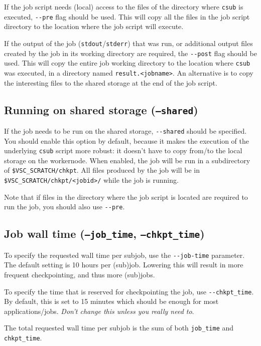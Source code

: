 If the job script needs (local) access to the files of the directory where \lstinline|csub|
is executed, \lstinline|--pre| flag should be used. This will copy all the files in the job
script directory to the location where the job script will execute.

If the output of the job (\lstinline|stdout|/\lstinline|stderr|) that was run,
or additional output files created by the job in its working directory are required,
the \lstinline|--post| flag should be used. This will copy the entire job working directory
to the location where \lstinline|csub| was executed, in a directory named \lstinline|result.<jobname>|.
An alternative is to copy the interesting files to the shared storage at the end of the job script.


\subsection{Running on shared storage (\texttt{--shared})}

If the job needs to be run on the shared storage, \lstinline|--shared| should be specified.
You should enable this option by default, because it makes the execution of the
underlying \lstinline|csub| script more robust: it doesn't have to copy from/to
the local storage on the workernode. When enabled, the job will be run in a
subdirectory of \lstinline|$VSC_SCRATCH/chkpt|. All files produced by the job will
be in \lstinline|$VSC_SCRATCH/chkpt/<jobid>/| while the job is running.

Note that if files in the directory where the job script is located are required to
run the job, you should also use \lstinline|--pre|.

\subsection{Job wall time (\texttt{--job\_time}, \texttt{--chkpt\_time})}

To specify the requested wall time per subjob, use the \lstinline|--job-time| parameter.
The default setting is 10 hours per (sub)job. Lowering this will result in more
frequent checkpointing, and thus more (sub)jobs.

To specify the time that is reserved for checkpointing the job, use \lstinline|--chkpt_time|.
By default, this is set to 15 minutes which should be enough for most applications/jobs.
\emph{Don't change this unless you really need to}.

The total requested wall time per subjob is the sum of both \lstinline|job_time| and \lstinline|chkpt_time|.

